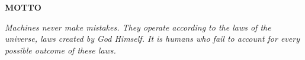 
\clearpage
{}
{}
\begin{center}
    \textbf{\large MOTTO}\\[3em]
\end{center}


\begin{center}
    \textit{Machines never make mistakes. They operate according to the laws of the universe, laws created by God Himself. It is humans who fail to account for every possible outcome of these laws.}
\end{center}

